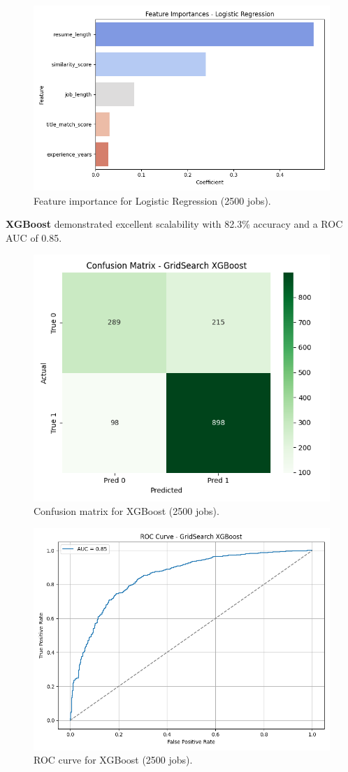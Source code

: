 \documentclass[a4paper]{article}
\begin{document}
\begin{multicols}{2}
\begin{figure}[H]
\centering
\includegraphics[width=0.8\linewidth]{Images/featimp_logreg_2500.png}
\caption{Feature importance for Logistic Regression (2500 jobs).}
\end{figure}

\textbf{XGBoost} demonstrated excellent scalability with 82.3\% accuracy and a ROC AUC of 0.85.

\begin{figure}[H]
\centering
\includegraphics[width=0.5\linewidth]{Images/conf_matrix_xgb_2500.png}
\caption{Confusion matrix for XGBoost (2500 jobs).}
\end{figure}

\begin{figure}[H]
\centering
\includegraphics[width=0.7\linewidth]{Images/roc_xgb_2500.png}
\caption{ROC curve for XGBoost (2500 jobs).}
\end{figure}


\end{multicols}
\end{document}
